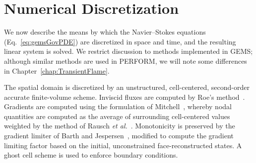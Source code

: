 \section{Numerical Discretization}\label{sec:numerics}
%
We now describe the means by which the Navier--Stokes equations (Eq.~\ref{eq:gemsGovPDE}) are discretized in space and time, and the resulting linear system is solved. We restrict discussion to methods implemented in GEMS; although similar methods are used in PERFORM, we will note some differences in Chapter~\ref{chap:TransientFlame}.

The spatial domain is discretized by an unstructured, cell-centered, second-order accurate finite-volume scheme. Inviscid fluxes are computed by Roe's method~\cite{Roe1981}. Gradients are computed using the formulation of Mitchell~\cite{Mitchell1994}, whereby nodal quantities are computed as the average of surrounding cell-centered values weighted by the method of Rausch \textit{et al.}~\cite{Rausch1991}. Monotonicity is preserved by the gradient limiter of Barth and Jespersen~\cite{Barth1989}, modified to compute the gradient limiting factor based on the initial, unconstrained face-reconstructed states. A ghost cell scheme is used to enforce boundary conditions.

